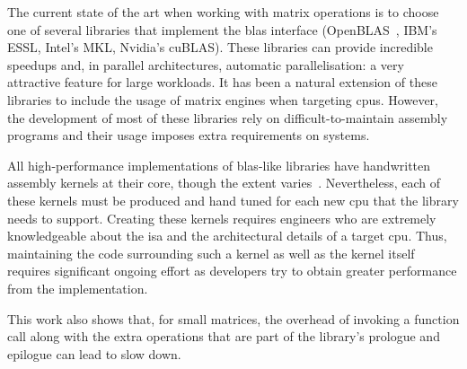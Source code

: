 \documentclass[\main/thesis.tex]{subfiles}
\begin{document}
The current state of the art when working with matrix operations is to choose one of several libraries that implement the \gls{blas} interface (\eg OpenBLAS~\autocite{2012xianyi}, IBM's ESSL, Intel's MKL, Nvidia's cuBLAS).
These libraries can provide incredible speedups and, in parallel architectures, automatic parallelisation: a very attractive feature for large workloads.
It has been a natural extension of these libraries to include the usage of matrix engines when targeting \glspl{cpu}.
However, the development of most of these libraries rely on difficult-to-maintain assembly programs and their usage imposes  extra requirements on systems.

All high-performance implementations of \gls{blas}-like libraries have handwritten assembly kernels at their core, though the extent varies~\autocite{zee2016blis}.
Nevertheless, each of these kernels must be produced and hand tuned for each new \gls{cpu} that the library needs to support.
Creating these kernels requires engineers who are extremely knowledgeable about the \gls{isa} and the architectural details of a target \gls{cpu}.
Thus, maintaining the code surrounding such a kernel as well as the kernel itself requires significant ongoing effort as developers try to obtain greater performance from the implementation.

This work also shows that, for small matrices, 
the overhead of invoking a function call along with the extra operations that are part of the library's prologue and epilogue can lead to slow down.
\end{document}
